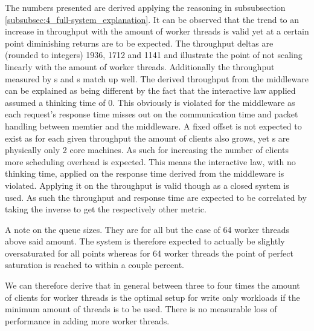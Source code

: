        The numbers presented are derived applying the reasoning in subsubsection
        \ref{subsubsec:4_full-system_explanation}. It can be observed that the trend to an increase in throughput with
        the amount of worker threads is valid yet at a certain point diminishing returns are to be expected. The
        throughput deltas are (rounded to integers) 1936, 1712 and 1141 and illustrate the point of not scaling linearly
        with the amount of worker threads. Additionally the throughput measured by \mw{}s and \cli{}s match up well. The
        derived throughput from the middleware can be explained as being different by the fact that the interactive law
        applied assumed a thinking time of 0. This obviously is violated for the middleware as each request's response
        time misses out on the communication time and packet handling between memtier and the middleware. A fixed offset
        is not expected to exist as for each given throughput the amount of clients also grows, yet \cli{}s are
        physically only 2 core machines. As such for increasing the number of clients more scheduling overhead is
        expected. This means the interactive law, with no thinking time, applied on the response time derived from the
        middleware is violated. Applying it on the throughput is valid though as a closed system is used. As such the
        throughput and response time are expected to be correlated by taking the inverse to get the respectively other
        metric.

        A note on the queue sizes. They are for all but the case of 64 worker threads above said amount. The system is
        therefore expected to actually be slightly oversaturated for all points whereas for 64 worker threads the point
        of perfect saturation is reached to within a couple percent.

        We can therefore derive that in general between three to four times the amount of clients for worker threads is
        the optimal setup for write only workloads if the minimum amount of threads is to be used. There is no
        measurable loss of performance in adding more worker threads.
